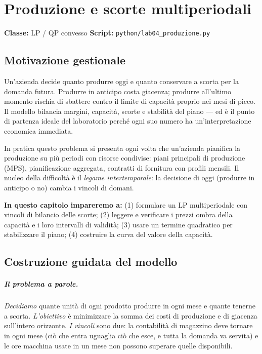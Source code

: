 \chapter{Produzione e scorte multiperiodali}
\label{cap:produzione}

\noindent\textbf{Classe:} LP / QP convesso \hfill
\textbf{Script:} \texttt{python/lab04\_produzione.py}

\section{Motivazione gestionale}

Un'azienda decide quanto produrre oggi e quanto conservare a scorta per la domanda
futura. Produrre in anticipo costa giacenza; produrre all'ultimo momento rischia di
sbattere contro il limite di capacità proprio nei mesi di picco. Il modello bilancia
margini, capacità, scorte e stabilità del piano --- ed è il punto di partenza ideale del
laboratorio perché ogni suo numero ha un'interpretazione economica immediata.



In pratica questo problema si presenta ogni volta che un'azienda pianifica la
produzione su più periodi con risorse condivise: piani principali di produzione
(MPS), pianificazione aggregata, contratti di fornitura con profili mensili. Il
nucleo della difficoltà è il \emph{legame intertemporale}: la decisione di oggi
(produrre in anticipo o no) cambia i vincoli di domani.

\textbf{In questo capitolo impareremo a:} (1) formulare un LP multiperiodale con
vincoli di bilancio delle scorte; (2) leggere e verificare i prezzi ombra della
capacità e i loro intervalli di validità; (3) usare un termine quadratico per
stabilizzare il piano; (4) costruire la curva del valore della capacità.

\section{Costruzione guidata del modello}

\paragraph{Il problema a parole.} \emph{Decidiamo} quante unità di ogni prodotto
produrre in ogni mese e quante tenerne a scorta. \emph{L'obiettivo} è minimizzare la
somma dei costi di produzione e di giacenza sull'intero orizzonte. \emph{I vincoli}
sono due: la contabilità di magazzino deve tornare in ogni mese (ciò che entra
uguaglia ciò che esce, e tutta la domanda va servita) e le ore macchina usate in un
mese non possono superare quelle disponibili.

